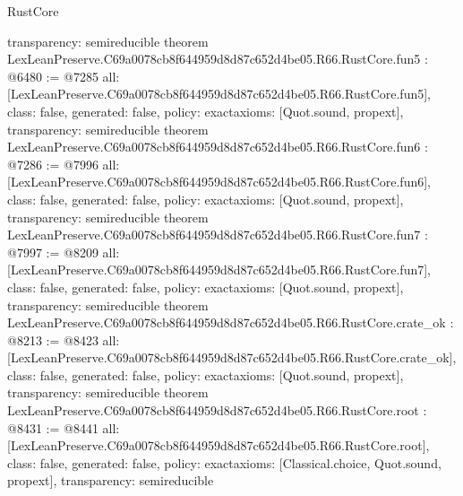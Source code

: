 \begin{lexlean}{RustCore}
\begin{coremodule}
{  transparency: semireducible
}
theorem LexLeanPreserve.C69a0078cb8f644959d8d87c652d4be05.R66.RustCore.fun5 : @6480 := @7285 {
  all: [LexLeanPreserve.C69a0078cb8f644959d8d87c652d4be05.R66.RustCore.fun5],
  class: false,
  generated: false,
  policy: exact{axioms: [Quot.sound, propext]},
  transparency: semireducible
}
theorem LexLeanPreserve.C69a0078cb8f644959d8d87c652d4be05.R66.RustCore.fun6 : @7286 := @7996 {
  all: [LexLeanPreserve.C69a0078cb8f644959d8d87c652d4be05.R66.RustCore.fun6],
  class: false,
  generated: false,
  policy: exact{axioms: [Quot.sound, propext]},
  transparency: semireducible
}
theorem LexLeanPreserve.C69a0078cb8f644959d8d87c652d4be05.R66.RustCore.fun7 : @7997 := @8209 {
  all: [LexLeanPreserve.C69a0078cb8f644959d8d87c652d4be05.R66.RustCore.fun7],
  class: false,
  generated: false,
  policy: exact{axioms: [Quot.sound, propext]},
  transparency: semireducible
}
theorem LexLeanPreserve.C69a0078cb8f644959d8d87c652d4be05.R66.RustCore.crate_ok : @8213 := @8423 {
  all: [LexLeanPreserve.C69a0078cb8f644959d8d87c652d4be05.R66.RustCore.crate_ok],
  class: false,
  generated: false,
  policy: exact{axioms: [Quot.sound, propext]},
  transparency: semireducible
}
theorem LexLeanPreserve.C69a0078cb8f644959d8d87c652d4be05.R66.RustCore.root : @8431 := @8441 {
  all: [LexLeanPreserve.C69a0078cb8f644959d8d87c652d4be05.R66.RustCore.root],
  class: false,
  generated: false,
  policy: exact{axioms: [Classical.choice, Quot.sound, propext]},
  transparency: semireducible
}


\end{coremodule}
\end{lexlean}
